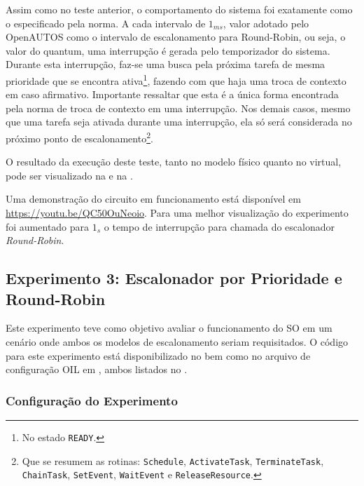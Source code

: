 Assim como no teste anterior, o comportamento do sistema foi exatamente como o especificado pela norma. A cada intervalo de $1_{ms}$, valor adotado pelo OpenAUTOS como o intervalo de escalonamento para Round-Robin, ou seja, o valor do quantum, uma interrupção é gerada pelo temporizador do sistema. Durante esta interrupção, faz-se uma busca pela próxima tarefa de mesma prioridade que se encontra ativa\footnote{No estado \texttt{READY}.}, fazendo com que haja uma troca de contexto em caso afirmativo. Importante ressaltar que esta é a única forma encontrada pela norma de troca de contexto em uma interrupção. Nos demais casos, mesmo que uma tarefa seja ativada durante uma interrupção, ela só será considerada no próximo ponto de escalonamento\footnote{Que se resumem as rotinas: \texttt{Schedule}, \texttt{ActivateTask}, \texttt{TerminateTask}, \texttt{ChainTask}, \texttt{SetEvent}, \texttt{WaitEvent} e \texttt{ReleaseResource}.}.

O resultado da execução deste teste, tanto no modelo físico quanto no virtual, pode ser visualizado na  e na .



Uma demonstração do circuito em funcionamento está disponível em \url{https://youtu.be/QC50OuNeoio}. Para uma melhor visualização do experimento foi aumentado para $1_s$ o tempo de interrupção para chamada do escalonador \emph{Round-Robin}.

\subsection{Experimento 3: Escalonador por Prioridade e Round-Robin}

Este experimento teve como objetivo avaliar o funcionamento do SO em um cenário onde ambos os modelos de escalonamento seriam requisitados. O código para este experimento está disponibilizado no  bem como no arquivo de configuração OIL em , ambos listados no .

\subsubsection{Configuração do Experimento}

